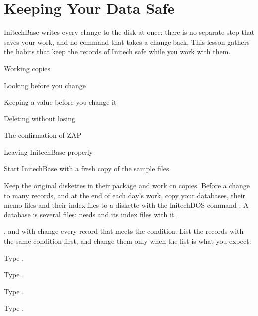 \chapter{Keeping Your Data Safe}
InitechBase writes every change to the disk at once: there is no separate
step that saves your work, and no command that takes a change back.  This
lesson gathers the habits that keep the records of Initech safe while you work
with them.

\begin{ChapterCovers}
\item Working copies
\item Looking before you change
\item Keeping a value before you change it
\item Deleting without losing
\item The confirmation of ZAP
\item Leaving InitechBase properly
\end{ChapterCovers}

Start InitechBase with a fresh copy of the sample files.

Keep the original diskettes in their package and work on copies.  Before a
change to many records, and at the end of each day's work, copy your databases,
their memo files and their index files to a diskette with the InitechDOS
command .  A database is several files:  needs
 and its index files with it.

,  and  with  change every record
that meets the condition.  List the records with the same condition first, and
change them only when the list is what you expect:
\begin{Steps}
\item Type .
\item Type .
\item Type .
\item Type .
\end{Steps}

